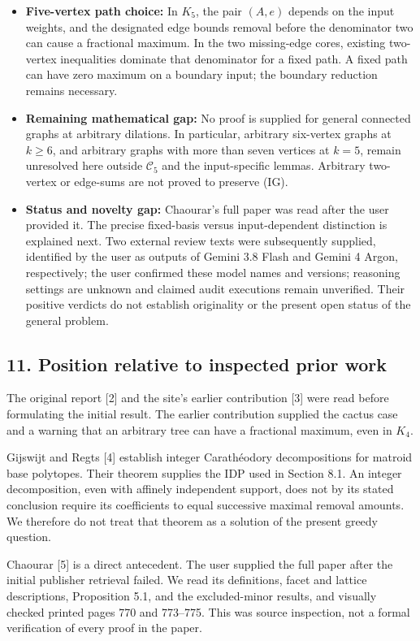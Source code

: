 \documentclass{article}
\begin{document}
\begin{itemize}
\item
  \textbf{Five-vertex path choice:} In \(K_5\), the pair \((A,e)\) depends on the input weights, and the designated edge bounds removal before the denominator two can cause a fractional maximum. In the two missing-edge cores, existing two-vertex inequalities dominate that denominator for a fixed path. A fixed path can have zero maximum on a boundary input; the boundary reduction remains necessary.
\item
  \textbf{Remaining mathematical gap:} No proof is supplied for general connected graphs at arbitrary dilations. In particular, arbitrary six-vertex graphs at \(k\ge6\), and arbitrary graphs with more than seven vertices at \(k=5\), remain unresolved here outside \(\mathcal C_5\) and the input-specific lemmas. Arbitrary two-vertex or edge-sums are not proved to preserve (IG).
\item
  \textbf{Status and novelty gap:} Chaourar's full paper was read after the user provided it. The precise fixed-basis versus input-dependent distinction is explained next. Two external review texts were subsequently supplied, identified by the user as outputs of Gemini 3.8 Flash and Gemini 4 Argon, respectively; the user confirmed these model names and versions; reasoning settings are unknown and claimed audit executions remain unverified. Their positive verdicts do not establish originality or the present open status of the general problem.
\end{itemize}

\subsection{11. Position relative to inspected prior work}

The original report [2] and the site's earlier contribution [3] were read before formulating the initial result. The earlier contribution supplied the cactus case and a warning that an arbitrary tree can have a fractional maximum, even in \(K_4\).

Gijswijt and Regts [4] establish integer Carathéodory decompositions for matroid base polytopes. Their theorem supplies the IDP used in Section 8.1. An integer decomposition, even with affinely independent support, does not by its stated conclusion require its coefficients to equal successive maximal removal amounts. We therefore do not treat that theorem as a solution of the present greedy question.

Chaourar [5] is a direct antecedent. The user supplied the full paper after the initial publisher retrieval failed. We read its definitions, facet and lattice descriptions, Proposition 5.1, and the excluded-minor results, and visually checked printed pages 770 and 773--775. This was source inspection, not a formal verification of every proof in the paper.
\end{document}
